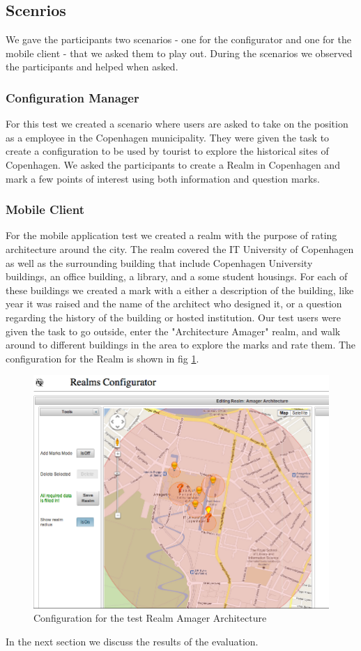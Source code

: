 \subsection{Scenrios} %
\label{sub:scenrios}
We gave the participants two scenarios - one for the configurator and one for the mobile client - that we asked them to play out. During the scenarios we observed the participants and helped when asked.

\subsubsection{Configuration Manager} %
\label{sub:configuration_manager_evaluation}
For this test we created a scenario where users are asked to take on the position as a employee in the Copenhagen municipality. They were given the task to create a configuration to be used by tourist to explore the historical sites of Copenhagen. We asked the participants to create a Realm in Copenhagen and mark a few points of interest using both information and question marks.


\subsubsection{Mobile Client} %
\label{sub:android_application_evaluation}

For the mobile application test we created a realm with the purpose of rating architecture around the city. The realm covered the IT University of Copenhagen as well as the surrounding building that include Copenhagen University buildings, an office building, a library, and a some student housings. For each of these buildings we created a mark with a either a description of the building, like year it was raised and the name of the architect who designed it, or a question regarding the history of the building or hosted institution. Our test users were given the task to go outside, enter the "Architecture Amager" realm, and walk around to different buildings in the area to explore the marks and rate them. The configuration for the Realm is shown in fig \ref{fig.amager.arc}.

\begin{figure}
	\centering
	\includegraphics[width=0.7\linewidth]{fig/amager_configuration}
	\caption{Configuration for the test Realm Amager Architecture}
	\label{fig.amager.arc}
\end{figure}

In the next section we discuss the results of the evaluation.

